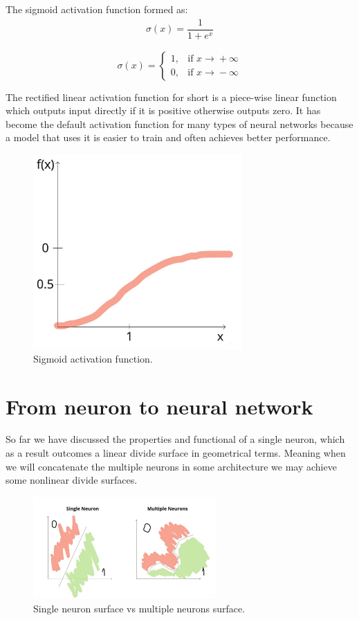 \documentclass{article}
\begin{document}
The sigmoid activation function formed as:
\begin{align*}
\sigma(x) = \dfrac{1}{1+e^x}
\end{align*}

\[ \sigma(x) = \begin{cases} 1, & \mbox{if } x\mbox{$\xrightarrow{} + \infty$} \\ 0, & \mbox{if } x\mbox{$\xrightarrow{} - \infty$} \end{cases} \]

The rectified linear activation function for short is a piece-wise linear function which outputs input directly if it is positive otherwise outputs zero. It has become the default activation function for many types of neural networks because a model that uses it is easier to train and often achieves better performance.

\begin{figure}[h]
    \centering \includegraphics[width=8cm]{images/sigmoid_function.jpg}
    \caption {Sigmoid activation function.}
\end{figure}

\section{From neuron to neural network}
So far we have discussed the properties and functional of a single neuron, which as a result outcomes a linear divide surface in geometrical terms. Meaning when we will concatenate the multiple neurons in some architecture we may achieve some nonlinear divide surfaces.
\begin{figure}[h]
    \centering \includegraphics[width=7cm]{images/neuron_to_neural_net.jpg}
    \caption {Single neuron surface vs multiple neurons surface.}
\end{figure}
\end{document}
